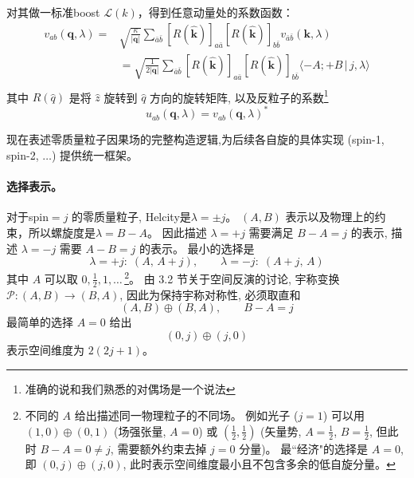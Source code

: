 对其做一标准boost $\mathscr{L}(k)$，得到任意动量处的系数函数：
\begin{equation}
    \begin{aligned}
    v_{ab}(\boldsymbol{q},\lambda) = &\sqrt{\frac{\kappa}{|\boldsymbol{q}|}} \sum_{\bar{a}\bar{b}} \left[ R(\hat{\boldsymbol{k}}) \right]_{a\bar{a}} \left[ R(\hat{\boldsymbol{k}}) \right]_{b\bar{b}} v_{\bar{a}\bar{b}}(\boldsymbol{k},\lambda)\\
        &= \sqrt{\frac{1}{2|\boldsymbol{q}|}} \sum_{\bar{a}\bar{b}} \left[ R(\hat{\boldsymbol{k}}) \right]_{a\bar{a}} \left[ R(\hat{\boldsymbol{k}}) \right]_{b\bar{b}}  \langle -A; +B \,|\, j, \lambda \rangle\\
    \end{aligned}
\end{equation}\label{massless_boost_u_k}
其中 $R(\hat{q})$ 是将 $\hat{z}$ 旋转到 $\hat{q}$ 方向的旋转矩阵,
以及反粒子的系数\footnote{准确的说和我们熟悉的对偶场是一个说法}
\begin{equation}
    u_{ab}(\boldsymbol{q},\lambda) =v_{ab}(\boldsymbol{q},\lambda)^*
\end{equation}



现在表述零质量粒子因果场的完整构造逻辑,为后续各自旋的具体实现 (spin-1, spin-2, $\ldots$) 提供统一框架。
\paragraph*{选择表示。}
对于spin$=j$ 的零质量粒子, Helcity是$\lambda=\pm j$。
 $(A,B)$ 表示以及物理上的约束，所以螺旋度是$\lambda=B-A$。
因此描述 $\lambda=+j$ 需要满足 $B-A=j$ 的表示,
描述 $\lambda=-j$ 需要 $A-B=j$ 的表示。
最小的选择是
\begin{equation}
    \lambda = +j:\; (A,\,A+j), \qquad \lambda = -j:\; (A+j,\,A)
    \label{eq:massless-rep-choice}
\end{equation}
其中 $A$ 可以取 $0, \frac{1}{2}, 1, \ldots$\,\footnote{%
不同的 $A$ 给出描述同一物理粒子的不同场。
例如光子 ($j=1$) 可以用 $(1,0)\oplus(0,1)$ (场强张量, $A=0$)
或 $(\frac{1}{2},\frac{1}{2})$ (矢量势, $A=\frac{1}{2}$, $B=\frac{1}{2}$,
但此时 $B-A=0\neq j$, 需要额外约束去掉 $j=0$ 分量)。
最``经济"的选择是 $A=0$, 即 $(0,j)\oplus(j,0)$,
此时表示空间维度最小且不包含多余的低自旋分量。}。
由 3.2 节关于空间反演的讨论, 宇称变换 $\mathcal{P}:(A,B)\to(B,A)$,
因此为保持宇称对称性, 必须取直和
\begin{equation}(A,B) \oplus (B,A), \qquad B-A = j
    \label{eq:massless-parity-rep}
\end{equation}
最简单的选择 $A=0$ 给出
\begin{equation}
    (0,j) \oplus (j,0)
    \label{eq:minimal-rep}
\end{equation}
表示空间维度为 $2(2j+1)$。
